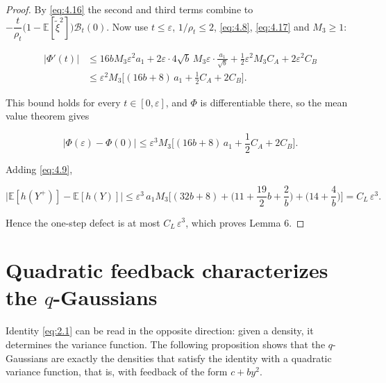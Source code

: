\documentclass[aip,jmp,preprint,onecolumn,floatfix,superscriptaddress,nofootinbib,11pt]{revtex4-2}
\theoremstyle{plain}
\theoremstyle{remark}
\numberwithin{equation}{section}
\newcommand{\E}{\mathbb{E}}
\newcommand{\eps}{\varepsilon}
\begin{document}
\begin{proof}
By \eqref{eq:4.16} the second and third terms combine to $-\dfrac{t}{\rho_t}\big(1-\E[\tilde\xi^{2}]\big)\mathcal B_t(0)$. Now use $t\le\eps$, $1/\rho_t\le2$, \eqref{eq:4.8}, \eqref{eq:4.17} and $M_3\ge1$:

\begin{equation*}
\begin{aligned} |\Phi'(t)|&\le16bM_3\eps^{2}a_1+2\eps\cdot4\sqrt b\,M_3\eps\cdot\frac{a_1}{\sqrt b}+\frac12\eps^{2}M_3C_A+2\eps^{2}C_B\\[4pt] &\le\eps^{2}M_3\Big[(16b+8)\,a_1+\frac12C_A+2C_B\Big]. \end{aligned}
\end{equation*}

This bound holds for every $t\in[0,\eps]$, and $\Phi$ is differentiable there, so the mean value theorem gives

\begin{equation*}
|\Phi(\eps)-\Phi(0)|\le\eps^{3}M_3\Big[(16b+8)\,a_1+\frac12C_A+2C_B\Big].
\end{equation*}

Adding \eqref{eq:4.9},

\begin{equation*}
\big|\E[h(Y^{+})]-\E[h(Y)]\big|\le\eps^{3}\,a_1M_3\Big[(32b+8)+\Big(11+\frac{19}{2}b+\frac2b\Big)+\Big(14+\frac4b\Big)\Big]=C_L\,\eps^{3}.
\end{equation*}

Hence the one-step defect is at most $C_L\,\eps^{3}$, which proves Lemma 6.

\end{proof}



\section{Quadratic feedback characterizes the $q$-Gaussians}\label{app:propE}

Identity \eqref{eq:2.1} can be read in the opposite direction: given a density, it determines the variance function. The following proposition shows that the $q$-Gaussians are exactly the densities that satisfy the identity with a quadratic variance function, that is, with feedback of the form $c+by^{2}$.
\end{document}
